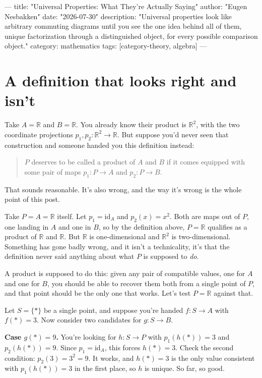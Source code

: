 ---
title: "Universal Properties: What They're Actually Saying"
author: "Eugen Nesbakken"
date: "2026-07-30"
description: "Universal properties look like arbitrary commuting diagrams until you see the one idea behind all of them, unique factorization through a distinguished object, for every possible comparison object."
category: mathematics
tags: [category-theory, algebra]
---

\section{A definition that looks right and isn't}

Take $A = \mathbb{R}$ and $B = \mathbb{R}$. You already know their product is $\mathbb{R}^2$, with the two coordinate projections $p_1, p_2 : \mathbb{R}^2 \to \mathbb{R}$. But suppose you'd never seen that construction and someone handed you this definition instead:

\begin{quote}
$P$ deserves to be called a product of $A$ and $B$ if it comes equipped with some pair of maps $p_1 : P \to A$ and $p_2 : P \to B$.
\end{quote}

That sounds reasonable. It's also wrong, and the way it's wrong is the whole point of this post.

Take $P = A = \mathbb{R}$ itself. Let $p_1 = \mathrm{id}_A$ and $p_2(x) = x^2$. Both are maps out of $P$, one landing in $A$ and one in $B$, so by the definition above, $P = \mathbb{R}$ qualifies as a product of $\mathbb{R}$ and $\mathbb{R}$. But $\mathbb{R}$ is one-dimensional and $\mathbb{R}^2$ is two-dimensional. Something has gone badly wrong, and it isn't a technicality, it's that the definition never said anything about what $P$ is supposed to \emph{do}.

A product is supposed to do this: given any pair of compatible values, one for $A$ and one for $B$, you should be able to recover them both from a single point of $P$, and that point should be the only one that works. Let's test $P = \mathbb{R}$ against that.

Let $S = \{*\}$ be a single point, and suppose you're handed $f : S \to A$ with $f(*) = 3$. Now consider two candidates for $g : S \to B$.

\textbf{Case $g(*) = 9$.} You're looking for $h : S \to P$ with $p_1(h(*)) = 3$ and $p_2(h(*)) = 9$. Since $p_1 = \mathrm{id}_A$, this forces $h(*) = 3$. Check the second condition: $p_2(3) = 3^2 = 9$. It works, and $h(*) = 3$ is the only value consistent with $p_1(h(*)) = 3$ in the first place, so $h$ is unique. So far, so good.

